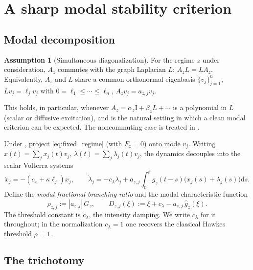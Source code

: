 \documentclass[11pt]{article}
\theoremstyle{plain}
\theoremstyle{definition}
\newtheorem{assumption}{Assumption}
\theoremstyle{remark}
\newcommand{\abs}[1]{\left\lvert #1 \right\rvert}
\newcommand{\dd}{\mathrm{d}}
\newcommand{\Laplace}{\widehat}
\newcommand{\branch}{\rho}
\newcommand{\id}{\mathrm{I}}
\begin{document}
\section{A sharp modal stability criterion}
\label{sec:spectral}

\subsection{Modal decomposition}

\begin{assumption}[Simultaneous diagonalization]
\label{ass:commute}
For the regime $z$ under consideration, $A_z$ commutes with the graph Laplacian $L$:
$A_zL=LA_z$. Equivalently, $A_z$ and $L$ share a common orthonormal eigenbasis
$\{v_j\}_{j=1}^n$, $Lv_j=\ell_j v_j$ with $0=\ell_1\le\cdots\le\ell_n$, $A_zv_j=a_{z,j}v_j$.
\end{assumption}

This holds, in particular, whenever $A_z=\alpha_z\id+\beta_z L+\cdots$ is a polynomial in $L$
(scalar or diffusive excitation), and is the natural setting in which a clean modal criterion can
be expected. The noncommuting case is treated in .

Under , project \eqref{eq:fixed_regime} (with $F_z=0$) onto mode $v_j$. Writing
$x(t)=\sum_j x_j(t)v_j$, $\lambda(t)=\sum_j\lambda_j(t)v_j$, the dynamics decouples into the scalar
Volterra systems
\begin{equation}
\label{eq:modal_system}
\dot x_j=-(c_x+\kappa\ell_j)x_j,\qquad
\dot\lambda_j=-c_\lambda\lambda_j+a_{z,j}\!\int_0^t g_z(t-s)\big(x_j(s)+\lambda_j(s)\big)\dd s .
\end{equation}
Define the \emph{modal fractional branching ratio} and the modal characteristic function
\begin{equation}
\label{eq:modal_branch}
\branch_{z,j}:=\abs{a_{z,j}}\,G_z,
\qquad
D_{z,j}(\xi):=\xi+c_\lambda-a_{z,j}\,\Laplace g_z(\xi).
\end{equation}
The threshold constant is $c_\lambda$, the intensity damping. We write $c_\lambda$ for it
throughout; in the normalization $c_\lambda=1$ one recovers the classical Hawkes threshold
$\branch=1$.

\subsection{The trichotomy}
\end{document}
